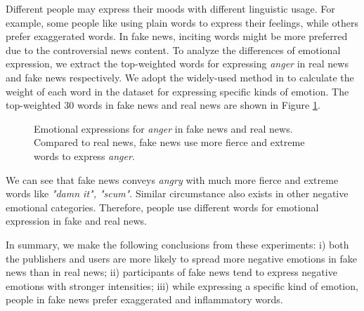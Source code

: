 \documentclass{article}
\begin{document}
	Different people may express their moods with different linguistic usage. For example, some people like using plain words to express their feelings, while others prefer exaggerated words. In fake news, inciting words might be more preferred due to the controversial news content. To analyze the differences of emotional expression, we extract the top-weighted words for expressing {\em anger} in real news and fake news respectively. We adopt the widely-used method in \cite{nlpcc14} to calculate the weight of each word in the dataset for expressing specific kinds of emotion. 
	The top-weighted 30 words in fake news and real news are shown in Figure \ref{Fig:emotionalExpression}. 
	\begin{figure}[h]
		\centering
		
		\begin{minipage}[t]{0.23\textwidth}
		\end{minipage}
		\begin{minipage}[t]{0.23\textwidth}
		\end{minipage}
		
		\caption{Emotional expressions for \textit{anger} in fake news and real news. Compared to real news, fake news use more fierce and extreme words to express {\em anger}.}
		\vspace{-0.2cm}
		\label{Fig:emotionalExpression}
	\end{figure}
	
	We can see that fake news conveys \textit{angry} with much more fierce and extreme words like {\em "damn it", "scum"}. Similar circumstance also exists in other negative emotional categories. Therefore, people use different words for emotional expression in fake and real news.
	
	In summary, we make the following conclusions from these experiments: i) both the publishers and users are more likely to spread more negative emotions in fake news than in real news; ii) participants of fake news tend to express negative emotions with stronger intensities; iii) while expressing a specific kind of emotion, people in fake news prefer exaggerated and inflammatory words. 
	
\end{document}
